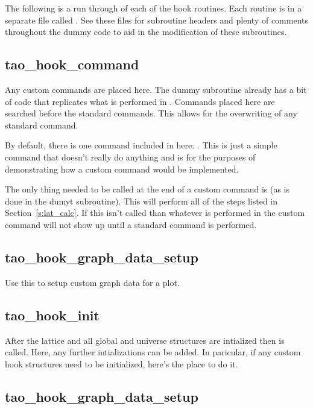 The following is a run through of each of the hook routines. Each routine
is in a separate file called . See these
files for subroutine headers and plenty of comments throughout the dummy code to aid
in the modification of these subroutines.

\subsection{tao\_hook\_command}

Any custom commands are placed here. The dummy subroutine already has a bit of
code that replicates what is performed in . Commands placed here
are searched before the standard \tao commands. This allows for the overwriting
of any standard \tao command.

By default, there is one command included in here: . This is just a
simple command that doesn't really do anything and is for the purposes of
demonstrating how a custom command would be implemented.

The only thing needed to be called at the end of a custom command is
 (as is done in the dumyt subroutine). This will perform
all of the steps listed in Section~\ref{s:lat_calc}. If this isn't called than
whatever is performed in the custom command will not show up until a standard
command is performed.

\subsection{tao\_hook\_graph\_data\_setup}

Use this to setup custom graph data for a plot.

\subsection{tao\_hook\_init}

After the lattice and all global and universe structures are intialized then
 is called. Here, any further intializations can be added. In
paricular, if any custom hook structures need to be initialized, here's the
place to do it.

\subsection{tao\_hook\_graph\_data\_setup}

